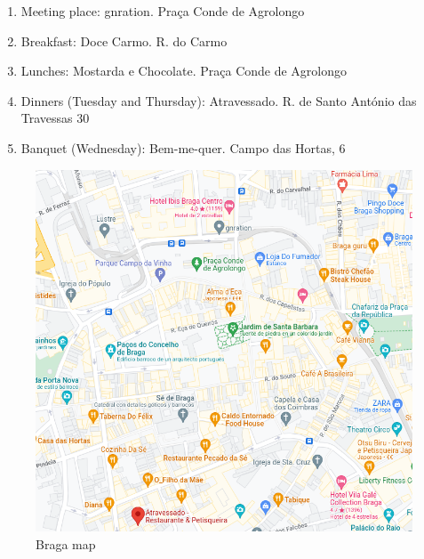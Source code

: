 \documentclass[11pt]{article}
\begin{document}
\begin{enumerate}
    \item Meeting place: 
gnration.
Praça Conde de Agrolongo 

\item Breakfast:
Doce Carmo.
R. do Carmo

\item Lunches:
Mostarda e Chocolate.
Praça Conde de Agrolongo

\item Dinners (Tuesday and Thursday):
Atravessado.
R. de Santo António das Travessas 30

\item Banquet (Wednesday):
Bem-me-quer.
Campo das Hortas, 6
\end{enumerate}

\begin{figure}[ht]
    \centering
    \includegraphics[scale=0.45, keepaspectratio]{braga_map.png}
    \caption{Braga map}
    \label{figure:map}
 \end{figure}
\end{document}
